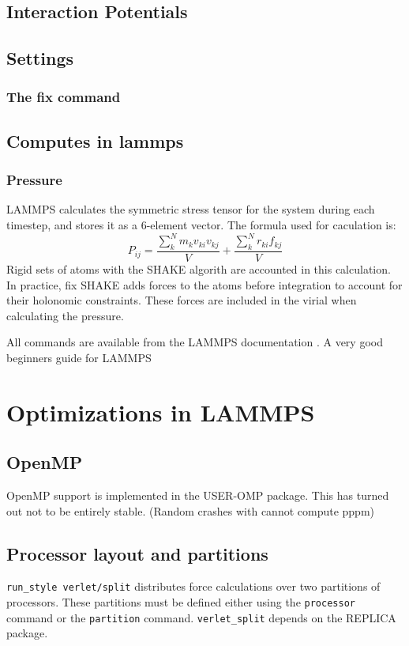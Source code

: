 \subsection{Interaction Potentials}

\subsection{Settings}
\subsubsection{The fix command}

\subsection{Computes in lammps}
\subsubsection{Pressure}
LAMMPS calculates the symmetric stress tensor for the system during each timestep, and stores it as a 6-element vector. The formula used for caculation is:
\begin{equation}
	P_{ij} = \frac{\sum_k^N  m_k v_{ki} v_{kj}}{V} + \frac{\sum_k^N r_{ki} f_{kj}}{V}
\end{equation}
Rigid sets of atoms with the SHAKE algorith are accounted in this calculation. In practice, fix SHAKE adds forces to the atoms before integration to account for their holonomic constraints. These forces are included in the virial when calculating the pressure. 


All commands are available from the LAMMPS documentation \cite{lammps:input_commands}. A very good beginners guide for LAMMPS \cite{lammps:guide:pittsburg}

\section{Optimizations in LAMMPS}
\subsection{OpenMP}
OpenMP support is implemented in the USER-OMP package. This has turned out not to be entirely stable. (Random crashes with cannot compute pppm)
\subsection{Processor layout and partitions}
{\tt run\_style verlet/split} distributes force calculations over two partitions of processors. These partitions must be defined either using the {\tt processor} command or the {\tt partition} command. {\tt verlet\_split} depends on the REPLICA package. 


